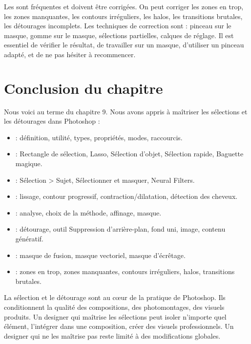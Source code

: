 Les  sont fréquentes et doivent être corrigées. On peut corriger les zones en trop, les zones manquantes, les contours irréguliers, les halos, les transitions brutales, les détourages incomplets. Les techniques de correction sont : pinceau sur le masque, gomme sur le masque, sélections partielles, calques de réglage. Il est essentiel de vérifier le résultat, de travailler sur un masque, d'utiliser un pinceau adapté, et de ne pas hésiter à recommencer.

\section*{Conclusion du chapitre}

Nous voici au terme du chapitre 9. Nous avons appris à maîtriser les sélections et les détourages dans Photoshop :

\begin{itemize}
    \item {} : définition, utilité, types, propriétés, modes, raccourcis.
    \item {} : Rectangle de sélection, Lasso, Sélection d'objet, Sélection rapide, Baguette magique.
    \item {} : Sélection > Sujet, Sélectionner et masquer, Neural Filters.
    \item {} : lissage, contour progressif, contraction/dilatation, détection des cheveux.
    \item {} : analyse, choix de la méthode, affinage, masque.
    \item {} : détourage, outil Suppression d'arrière-plan, fond uni, image, contenu génératif.
    \item {} : masque de fusion, masque vectoriel, masque d'écrêtage.
    \item {} : zones en trop, zones manquantes, contours irréguliers, halos, transitions brutales.
\end{itemize}

La sélection et le détourage sont au cœur de la pratique de Photoshop. Ils conditionnent la qualité des compositions, des photomontages, des visuels produits. Un designer qui maîtrise les sélections peut isoler n'importe quel élément, l'intégrer dans une composition, créer des visuels professionnels. Un designer qui ne les maîtrise pas reste limité à des modifications globales.

